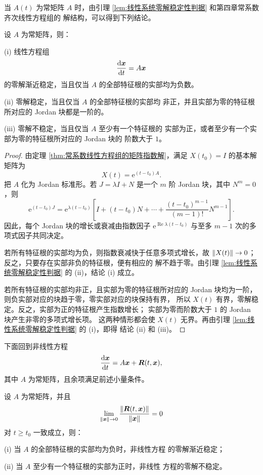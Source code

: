 当 $A(t)$ 为常矩阵 $A$ 时，由引理
\ref{lem:线性系统零解稳定性判据} 和第四章常系数齐次线性方程组的
解结构，可以得到下列结论。

\begin{theorem}\label{thm:常系数线性系统零解稳定性判据}
	设 $A$ 为常矩阵，则：

	\textnormal{(i)} 线性方程组
	\[
		\dfrac{\mathrm{d}\boldsymbol{x}}{\mathrm{d} t}=A\boldsymbol{x}
	\]
	的零解渐近稳定，当且仅当 $A$ 的全部特征根的实部均为负数。

	\textnormal{(ii)} 零解稳定，当且仅当 $A$ 的全部特征根的实部均
	非正，并且实部为零的特征根所对应的 Jordan 块都是一阶的。

	\textnormal{(iii)} 零解不稳定，当且仅当 $A$ 至少有一个特征根的
	实部为正，或者至少有一个实部为零的特征根所对应的 Jordan 块的
	阶数大于 $1$。
\end{theorem}

\begin{proof}
	由定理 \ref{thm:常系数线性方程组的矩阵指数解}，满足
	$X(t_0)=I$ 的基本解矩阵为
	\[
		X(t)=\mathrm{e}^{(t-t_0)A}.
	\]
	把 $A$ 化为 Jordan 标准形。若
	$J=\lambda I+N$ 是一个 $m$ 阶 Jordan 块，其中
	$N^m=0$，则
	\[
		\mathrm{e}^{(t-t_0)J}
		=\mathrm{e}^{\lambda(t-t_0)}
		\left[
		I+(t-t_0)N+\cdots+
		\dfrac{(t-t_0)^{m-1}}{(m-1)!}N^{m-1}
		\right].
	\]
	因此，每个 Jordan 块的增长或衰减由指数因子
	$\mathrm{e}^{\operatorname{Re}\lambda(t-t_0)}$ 与至多
	$m-1$ 次的多项式因子共同决定。

	若所有特征根的实部均为负，则指数衰减快于任意多项式增长，故
	$\left\| X(t) \right\|\to0$；反之，只要存在实部非负的特征根，便有相应的
	解不趋于零。由引理 \ref{lem:线性系统零解稳定性判据} 的
	\textnormal{(ii)}，结论 \textnormal{(i)} 成立。

	若所有特征根的实部均非正，且实部为零的特征根所对应的 Jordan
	块均为一阶，则负实部对应的块趋于零，零实部对应的块保持有界，
	所以 $X(t)$ 有界，零解稳定。反之，实部为正的特征根产生指数增长；
	实部为零而阶数大于 $1$ 的 Jordan 块产生非零的多项式增长项。
	这两种情形都会使 $X(t)$ 无界。再由引理
	\ref{lem:线性系统零解稳定性判据} 的 \textnormal{(i)}，即得
	结论 \textnormal{(ii)} 和 \textnormal{(iii)}。
\end{proof}

下面回到非线性方程
\[
	\dfrac{\mathrm{d}\boldsymbol{x}}{\mathrm{d} t}
	=A\boldsymbol{x}+\boldsymbol{R}(t,\boldsymbol{x}),
\]
其中 $A$ 为常矩阵，且余项满足前述小量条件。

\begin{theorem}\label{thm:线性近似决定非线性系统稳定性}
	设 $A$ 为常矩阵，并且
	\[
		\lim_{\left\| \boldsymbol{x} \right\|\to0}
		\dfrac{\left\| \boldsymbol{R}(t,\boldsymbol{x}) \right\|}
		{\left\| \boldsymbol{x} \right\|}=0
	\]
	对 $t\geq t_0$ 一致成立，则：

	\textnormal{(i)} 当 $A$ 的全部特征根的实部均为负时，非线性方程
	的零解渐近稳定；

	\textnormal{(ii)} 当 $A$ 至少有一个特征根的实部为正时，非线性
	方程的零解不稳定。
\end{theorem}

